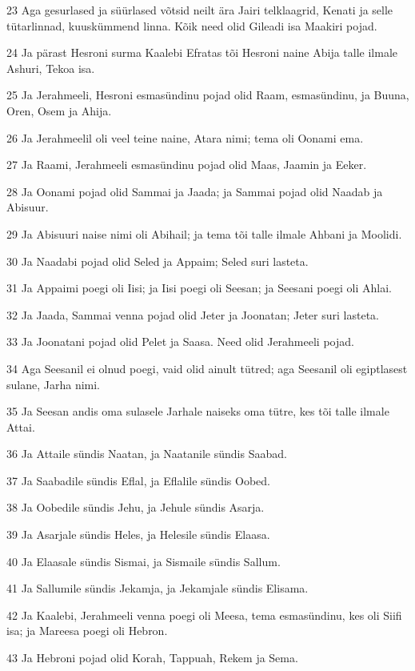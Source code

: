 \par 23 Aga gesurlased ja süürlased võtsid neilt ära Jairi telklaagrid, Kenati ja selle tütarlinnad, kuuskümmend linna. Kõik need olid Gileadi isa Maakiri pojad.
\par 24 Ja pärast Hesroni surma Kaalebi Efratas tõi Hesroni naine Abija talle ilmale Ashuri, Tekoa isa.
\par 25 Ja Jerahmeeli, Hesroni esmasündinu pojad olid Raam, esmasündinu, ja Buuna, Oren, Osem ja Ahija.
\par 26 Ja Jerahmeelil oli veel teine naine, Atara nimi; tema oli Oonami ema.
\par 27 Ja Raami, Jerahmeeli esmasündinu pojad olid Maas, Jaamin ja Eeker.
\par 28 Ja Oonami pojad olid Sammai ja Jaada; ja Sammai pojad olid Naadab ja Abisuur.
\par 29 Ja Abisuuri naise nimi oli Abihail; ja tema tõi talle ilmale Ahbani ja Moolidi.
\par 30 Ja Naadabi pojad olid Seled ja Appaim; Seled suri lasteta.
\par 31 Ja Appaimi poegi oli Iisi; ja Iisi poegi oli Seesan; ja Seesani poegi oli Ahlai.
\par 32 Ja Jaada, Sammai venna pojad olid Jeter ja Joonatan; Jeter suri lasteta.
\par 33 Ja Joonatani pojad olid Pelet ja Saasa. Need olid Jerahmeeli pojad.
\par 34 Aga Seesanil ei olnud poegi, vaid olid ainult tütred; aga Seesanil oli egiptlasest sulane, Jarha nimi.
\par 35 Ja Seesan andis oma sulasele Jarhale naiseks oma tütre, kes tõi talle ilmale Attai.
\par 36 Ja Attaile sündis Naatan, ja Naatanile sündis Saabad.
\par 37 Ja Saabadile sündis Eflal, ja Eflalile sündis Oobed.
\par 38 Ja Oobedile sündis Jehu, ja Jehule sündis Asarja.
\par 39 Ja Asarjale sündis Heles, ja Helesile sündis Elaasa.
\par 40 Ja Elaasale sündis Sismai, ja Sismaile sündis Sallum.
\par 41 Ja Sallumile sündis Jekamja, ja Jekamjale sündis Elisama.
\par 42 Ja Kaalebi, Jerahmeeli venna poegi oli Meesa, tema esmasündinu, kes oli Siifi isa; ja Mareesa poegi oli Hebron.
\par 43 Ja Hebroni pojad olid Korah, Tappuah, Rekem ja Sema.
